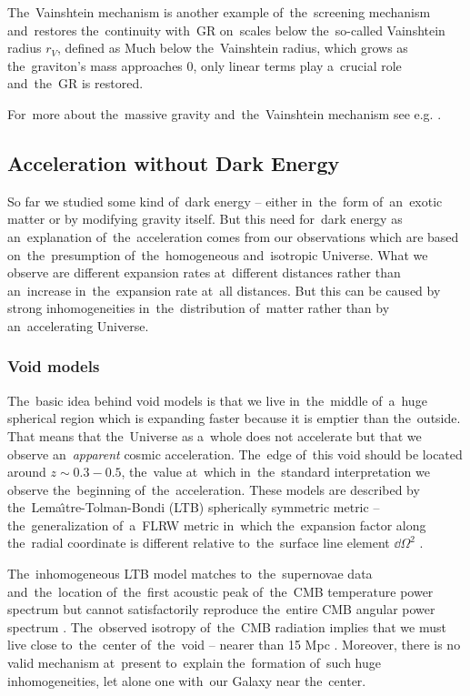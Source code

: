 The~Vainshtein mechanism is another example of~the~screening mechanism and~restores the~continuity with~GR on~scales below the~so-called Vainshtein radius $r_V$, defined as
Much below the~Vainshtein radius, which grows as the~graviton's mass approaches $0$, only linear terms play a~crucial role and~the~GR is restored.

For~more about the~massive gravity and~the~Vainshtein mechanism see e.g. \textcite{2013CQGra..30r4001B,2012RvMP...84..671H}.

\subsection{Acceleration without Dark Energy}
So far we studied some kind of~dark energy -- either in~the~form of~an~exotic matter or by modifying gravity itself. But this need for~dark energy as an~explanation of~the~acceleration comes from our observations which are based on~the~presumption of~the~homogeneous and~isotropic Universe. What we observe are different expansion rates at~different distances rather than an~increase in~the~expansion rate at~all distances. But this can be caused by strong inhomogeneities in~the~distribution of~matter rather than by an~accelerating Universe.
\subsubsection{Void models}
The~basic idea behind void models is that we live in~the~middle of~a~huge spherical region which is expanding faster because it is emptier than the~outside. That means that the~Universe as a~whole does not accelerate but that we observe an~\textit{apparent} cosmic acceleration. The~edge of~this void should be located around $z\sim0.3-0.5$, the~value at~which in~the~standard interpretation we observe the~beginning of~the~acceleration. These models are described by the~Lema\^\i tre-Tolman-Bondi (LTB) spherically symmetric metric -- the~generalization of~a~FLRW metric in~which the~expansion factor along the~radial coordinate is different relative to~the~surface line element $\dd\Omega^2$ \parencite{2013JCAP...02..047D,2006PhRvD..73h3519A}.

The~inhomogeneous LTB model matches to~the~supernovae data and~the~location of~the~first acoustic peak of~the~CMB temperature power spectrum but cannot satisfactorily reproduce the~entire CMB angular power spectrum \parencite{2011JCAP...02..013C}. The~observed isotropy of~the~CMB radiation implies that we must live close to~the~center of~the~void -- nearer than 15 Mpc \parencite{2006PhRvD..74j3520A}. Moreover, there is no valid mechanism at~present to~explain the~formation of~such huge inhomogeneities, let alone one with~our Galaxy near the~center.
